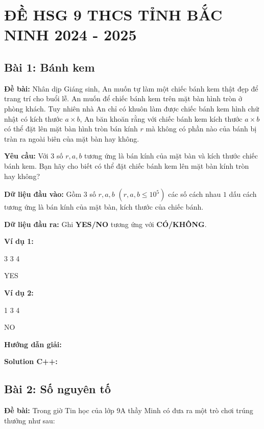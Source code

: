 \documentclass[12pt]{scrartcl}  %
\begin{document}
\section{ĐỀ HSG 9 THCS TỈNH BẮC NINH 2024 - 2025}

\subsection{Bài 1: Bánh kem}
\textbf{Đề bài:}
Nhân dịp Giáng sinh, An muốn tự làm một chiếc bánh kem thật đẹp để trang trí cho buổi lễ. 
An muốn để chiếc bánh kem trên mặt bàn hình tròn ở phòng khách. Tuy nhiên nhà An chỉ có khuôn
làm được chiếc bánh kem hình chữ nhật có kích thước $a \times b$, An băn khoăn rằng với chiếc
bánh kem kích thước $a \times b$ có thể đặt lên mặt bàn hình tròn bán kính $r$ mà không có
phần nào của bánh bị tràn ra ngoài biên của mặt bàn hay không.

\textbf{Yêu cầu:}
Với $3$ số $r, a, b$ tương ứng là bán kính của mặt bàn và kích thước chiếc bánh kem. Bạn hãy cho biết có thể đặt chiếc bánh kem lên mặt bàn kính tròn hay không?


\textbf{Dữ liệu đầu vào:}
Gồm $3$ số $r, a, b$ $(r, a, b \leq 10^5)$ các số cách nhau $1$ dấu cách tương ứng là bán kính của mặt bàn, kích thước của chiếc bánh.

\textbf{Dữ liệu đầu ra:}
Ghi \textbf{YES/NO} tương ứng với \textbf{CÓ/KHÔNG}.

\textbf{Ví dụ 1:}
\begin{tcolorbox}[colback=gray!5!white, colframe=blue!50!black, title=Input]
3 3 4
\end{tcolorbox}
\begin{tcolorbox}[colback=gray!5!white, colframe=green!50!black, title=Output]
YES
\end{tcolorbox}

\textbf{Ví dụ 2:}
\begin{tcolorbox}[colback=gray!5!white, colframe=blue!50!black, title=Input]
1 3 4
\end{tcolorbox}
\begin{tcolorbox}[colback=gray!5!white, colframe=green!50!black, title=Output]
NO
\end{tcolorbox}

\textbf{Hướng dẫn giải:}

\textbf{Solution C++:}

\subsection{Bài 2: Số nguyên tố}
\textbf{Đề bài:}
Trong giờ Tin học của lớp 9A thầy Minh có đưa ra một trò chơi trúng thưởng như sau:
\end{document}
